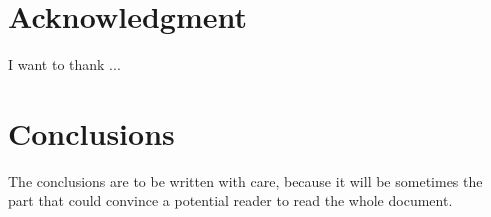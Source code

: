 \documentclass[12pt,a4paper,oneside]{book}
\let\emph\relax %
\theoremstyle{definition}
\theoremstyle{remark}
\theoremstyle{plain}
\numberwithin{theorem}{section}
\begin{document}

\chapter*{Acknowledgment}
\thispagestyle{empty}

\noindent I want to thank ...

\thispagestyle{empty}
\setcounter{page}{0}
\tableofcontents
\mainmatter
\setcounter{page}{1}








\chapter*{Conclusions}

The conclusions are to be written with care, because it will be sometimes the part that could convince a potential reader to read the whole document.





\backmatter

\printindex %




\listoftodos
\end{document}

